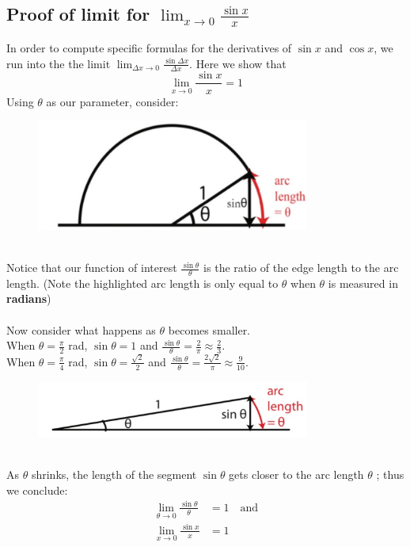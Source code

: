 \documentclass{report}
\begin{document}
\subsection{Proof of limit for $\lim_{x\to 0}\frac{\sin x}{x}$} %
In order to compute specific formulas for the derivatives of $\sin x$ and $\cos x$, we run into 
the the limit $\lim_{\Delta x\to 0}\frac{\sin\Delta x}{\Delta x}$. Here we show that
\begin{equation*}
\lim_{x\to 0}\frac{\sin x}{x}=1
\end{equation*}
Using $\theta$ as our parameter, consider:
\begin{figure}[h]
\includegraphics[width=9cm]{Capture7}
\centering
{}
\end{figure}\\
Notice that our function of interest $\frac{\sin\theta}{\theta}$ is the ratio of the edge length
to the arc length.
(Note the highlighted arc length is only equal to $\theta$ when $\theta$ is measured in
\textbf{radians})\\
\vspace{2mm}\\
Now consider what happens as $\theta$ becomes smaller.\\ When $\theta=\frac{\pi}{2}$ rad,
$\sin\theta=1$ and $\frac{\sin\theta}{\theta}=\frac{2}{\pi}\approx\frac{2}{3}$.\\
When $\theta=\frac{\pi}{4}$ rad,
$\sin\theta=\frac{\sqrt{2}}{2}$ and $\frac{\sin\theta}{\theta}=\frac{2\sqrt{2}}{\pi}
\approx\frac{9}{10}$.\\
\begin{figure}[h]
\includegraphics[width=9cm]{Capture8}
\centering
{}
\end{figure}\\
As $\theta$ shrinks, the length of the segment $\sin\theta$ gets closer to the arc length $\theta$
; thus we conclude:
\begin{align*}
\lim_{\theta\to 0}\frac{\sin\theta}{\theta}&=1\quad\text{and}\\
\lim_{x\to 0}\frac{\sin x}{x}&=1
\end{align*}
\newpage
\end{document}

